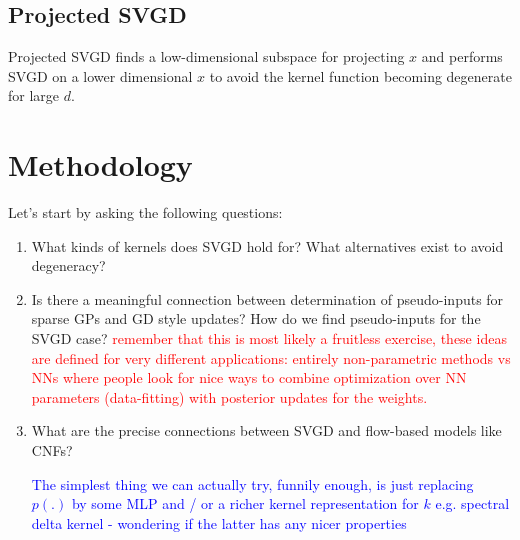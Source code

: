 \documentclass[12pt]{article}
\renewcommand{\[}{\left[}
\renewcommand{\]}{\right]}
\renewcommand{\(}{\left(}
\renewcommand{\)}{\right)}
\begin{document}



\subsection{Projected SVGD}
\citep{chen_projected_2020} Projected SVGD finds a low-dimensional subspace for projecting $x$ and performs SVGD on a lower dimensional $x$ to avoid the kernel function becoming degenerate for large $d$.

\section{Methodology}

Let's start by asking the following questions:
\begin{enumerate}
    \item What kinds of kernels does SVGD hold for? What alternatives exist to avoid degeneracy?

    \item Is there a meaningful connection between determination of pseudo-inputs for sparse GPs and GD style updates? How do we find pseudo-inputs for the SVGD case? \textcolor{red}{remember that this is most likely a fruitless exercise, these ideas are defined for very different applications: entirely non-parametric methods vs NNs where people look for nice ways to combine optimization over NN parameters (data-fitting) with posterior updates for the weights.}

    \item What are the precise connections between SVGD and flow-based models like CNFs?


    \textcolor{blue}{The simplest thing we can actually try, funnily enough, is just replacing $p(.)$ by some MLP and / or a richer kernel representation for $k$ e.g. spectral delta kernel - wondering if the latter has any nicer properties}
\end{enumerate}
\end{document}

